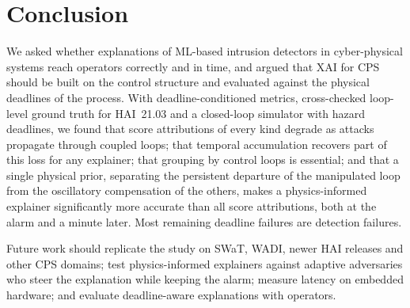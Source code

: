 \section{Conclusion}\label{sec:conclusion}
We asked whether explanations of ML-based intrusion detectors in cyber-physical systems reach operators correctly and in time, and argued that XAI for CPS should be built on the control structure and evaluated against the physical deadlines of the process. With deadline-conditioned metrics, cross-checked loop-level ground truth for HAI~21.03 and a closed-loop simulator with hazard deadlines, we found that score attributions of every kind degrade as attacks propagate through coupled loops; that temporal accumulation recovers part of this loss for any explainer; that grouping by control loops is essential; and that a single physical prior, separating the persistent departure of the manipulated loop from the oscillatory compensation of the others, makes a physics-informed explainer significantly more accurate than all score attributions, both at the alarm and a minute later. Most remaining deadline failures are detection failures.

Future work should replicate the study on SWaT, WADI, newer HAI releases and other CPS domains; test physics-informed explainers against adaptive adversaries who steer the explanation while keeping the alarm; measure latency on embedded hardware; and evaluate deadline-aware explanations with operators.
